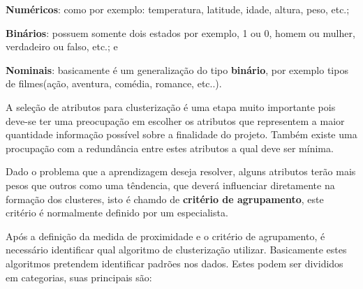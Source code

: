 \begin{alineas}
	\item \textbf{Numéricos}: como por exemplo: temperatura, latitude, idade, altura, peso, etc.; 
	\item \textbf{Binários}: possuem somente dois estados por exemplo, 1 ou 0, homem ou mulher, verdadeiro ou falso, etc.; e
	\item \textbf{Nominais}: basicamente é um generalização do tipo \textbf{binário}, por exemplo tipos de filmes(ação, aventura, comédia, romance, etc..).  
\end{alineas}

A seleção de atributos para clusterização é uma etapa muito importante pois deve-se ter uma preocupação em escolher os atributos
que representem a maior quantidade informação possível sobre a finalidade do projeto. Também existe uma procupação com a redundância
entre estes atributos a qual deve ser mínima.

Dado o problema que a aprendizagem deseja resolver, alguns atributos terão mais pesos que outros como uma têndencia, que deverá influenciar
diretamente na formação dos clusteres, isto é chamdo de \textbf{critério de agrupamento}, este critério é normalmente definido por um especialista.

Após a definição da medida de proximidade e o critério de agrupamento, é necessário identificar qual algoritmo de clusterização utilizar.
Basicamente estes algoritmos pretendem identificar padrões nos dados. Estes podem ser divididos em categorias, suas principais são:

